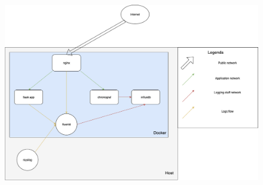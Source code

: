 \documentclass[12pt]{article}
\renewcommand{\_}{\kern-1.5pt\textunderscore\kern-1.5pt}
\begin{document}
\begin{enumerate}

\begin{figure}[H]
	\begin{FlushLeft}		\includegraphics[width=4.78in,height=3.31in]{./media/image1.png}
	\end{FlushLeft}\end{figure}



\tab \par


\vspace{\baselineskip}

\vspace{\baselineskip}

\vspace{\baselineskip}

\vspace{\baselineskip}

\vspace{\baselineskip}

\vspace{\baselineskip}

\vspace{\baselineskip}

\vspace{\baselineskip}

\vspace{\baselineskip}

\vspace{\baselineskip}

\vspace{\baselineskip}

\vspace{\baselineskip}


\end{enumerate}
\end{document}

